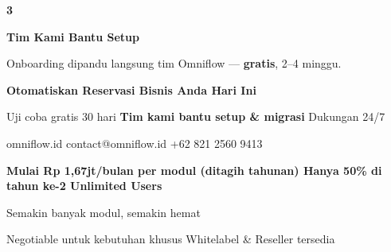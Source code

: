 \documentclass[a4paper]{article}
\begin{document}
\begin{center}
\begin{minipage}[t]{0.318\textwidth}
{\begin{minipage}[t][4.7cm][c]{\dimexpr\linewidth-2\fboxsep\relax}
            \begin{center}{\fontsize{22}{26}\selectfont\bfseries\color{BluePrimary} 3}\end{center}
            \vspace{2pt}
            \begin{center}
                {\fontsize{10}{13}\selectfont\bfseries\color{BlueDark} Tim Kami Bantu Setup}\par\vspace{3pt}
                {\fontsize{9}{12}\selectfont\color{TextDark} Onboarding dipandu langsung tim Omniflow --- \textbf{gratis}, 2--4 minggu.}
            \end{center}
        \end{minipage}}
\end{minipage}
\end{center}

\vspace{8pt}

{\setlength{\fboxsep}{10pt}\setlength{\fboxrule}{0pt}%
\noindent\colorbox{BluePrimary}{%
    \begin{minipage}{\dimexpr\textwidth-2\fboxsep\relax}
        \centering
        {\fontsize{13}{16}\selectfont\bfseries\color{White} Otomatiskan Reservasi Bisnis Anda Hari Ini}\par\vspace{3pt}
        {\fontsize{9.5}{12}\selectfont\color{BlueMid} Uji coba gratis 30 hari \enspace\textbullet\enspace \textbf{Tim kami bantu setup \& migrasi} \enspace\textbullet\enspace Dukungan 24/7}\par\vspace{2pt}
        {\fontsize{9.5}{12}\selectfont\color{BlueLight} omniflow.id \enspace\textbullet\enspace contact@omniflow.id \enspace\textbullet\enspace +62 821 2560 9413}
    \end{minipage}}}


\vspace{6pt}

{\setlength{\fboxsep}{8pt}\setlength{\fboxrule}{0pt}%
\noindent\colorbox{BlueBg}{%
    \begin{minipage}{\dimexpr\textwidth-2\fboxsep\relax}
        \centering
        {\fontsize{9}{12}\selectfont\bfseries\color{BluePrimary}
        Mulai Rp 1,67jt/bulan per modul (ditagih tahunan) \enspace\textbullet\enspace Hanya 50\% di tahun ke-2 \enspace\textbullet\enspace Unlimited Users}\par\vspace{1pt}
        {\fontsize{8.5}{11}\selectfont\color{BlueDark}
        Semakin banyak modul, semakin hemat}\par\vspace{1pt}
        {\fontsize{8}{10}\selectfont\color{TextLight}
        Negotiable untuk kebutuhan khusus \enspace\textbullet\enspace Whitelabel \& Reseller tersedia}
    \end{minipage}}}

\restoregeometry
\pagestyle{empty}
\end{document}
